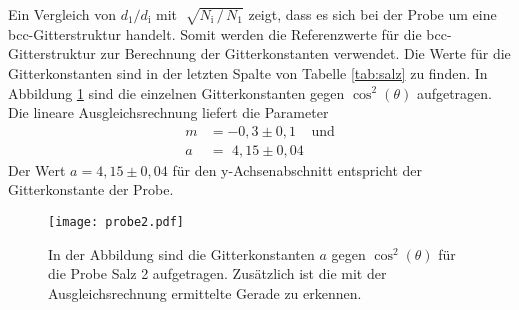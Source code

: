 Ein Vergleich von $d_1 / d_\text{i}$ mit $\sqrt[]{N_\text{i}\, / \, N_1}$ zeigt, dass es sich bei der Probe um eine bcc-Gitterstruktur handelt.
Somit werden die
Referenzwerte für die bcc-Gitterstruktur zur Berechnung der Gitterkonstanten verwendet. Die Werte für die Gitterkonstanten sind in der letzten Spalte von
Tabelle \ref{tab:salz} zu finden. In Abbildung \ref{abb:salz} sind die einzelnen Gitterkonstanten gegen $\cos^2(\theta)$ aufgetragen. Die lineare Ausgleichsrechnung liefert
die Parameter
\begin{align*}
  m &= -0,3\pm0,1~~~~~\text{und}\\
  a &= \,\,4,15\pm0,04
\end{align*}
Der Wert $a = 4,15\pm0,04$ für den y-Achsenabschnitt entspricht der Gitterkonstante der Probe.

\begin{figure}[H]
  \centering
  \texttt{[image: probe2.pdf]}
  \caption{In der Abbildung sind die Gitterkonstanten $a$ gegen $\cos^2(\theta)$ für die Probe Salz 2 aufgetragen. Zusätzlich ist die mit der Ausgleichsrechnung
  ermittelte Gerade zu erkennen.}
  \label{abb:salz}
\end{figure}
